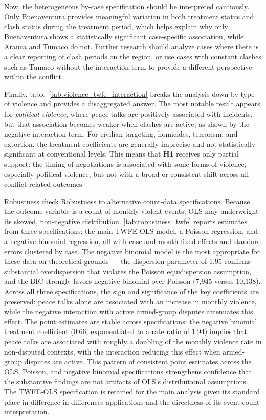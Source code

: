 \documentclass[11pt]{article}
\begin{document}
Now, the heterogeneous by-case specification should be interpreted cautiously. Only Buenaventura provides meaningful variation in both treatment status and clash status during the treatment period, which helps explain why only Buenaventura shows a statistically significant case-specific association, while Arauca and Tumaco do not. Further research should analyze cases where there is a clear reporting of clash periods on the region, or use cases with constant clashes such as Tumaco without the interaction term to provide a different perspective within the conflict.

{\small\setlength{\tabcolsep}{4pt}}

Finally, table~\ref{tab:violence_twfe_interaction} breaks the analysis down by type of violence and provides a disaggregated answer. The most notable result appears for \emph{political violence}, where peace talks are positively associated with incidents, but that association becomes weaker when clashes are active, as shown by the negative interaction term. For civilian targeting, homicides, terrorism, and extortion, the treatment coefficients are generally imprecise and not statistically significant at conventional levels. This means that \textbf{H1} receives only partial support: the timing of negotiations is associated with some forms of violence, especially political violence, but not with a broad or consistent shift across all conflict-related outcomes. 

Robustness check
Robustness to alternative count-data specifications. Because the outcome variable is a count of monthly violent events, OLS may underweight its skewed, non-negative distribution. \ref{tab:robustness_twfe} reports estimates from three specifications: the main TWFE OLS model, a Poisson regression, and a negative binomial regression, all with case and month fixed effects and standard errors clustered by case. The negative binomial model is the most appropriate for these data on theoretical grounds — the dispersion parameter of 1.95 confirms substantial overdispersion that violates the Poisson equidispersion assumption, and the BIC strongly favors negative binomial over Poisson (7,945 versus 10,138). Across all three specifications, the sign and significance of the key coefficients are preserved: peace talks alone are associated with an increase in monthly violence, while the negative interaction with active armed-group disputes attenuates this effect. The point estimates are stable across specifications: the negative binomial treatment coefficient (0.66, exponentiated to a rate ratio of 1.94) implies that peace talks are associated with roughly a doubling of the monthly violence rate in non-disputed contexts, with the interaction reducing this effect when armed-group disputes are active. This pattern of consistent point estimates across the OLS, Poisson, and negative binomial specifications strengthens confidence that the substantive findings are not artifacts of OLS's distributional assumptions. The TWFE-OLS specification is retained for the main analysis given its standard place in difference-in-differences applications and the directness of its event-count interpretation. 
\end{document}
